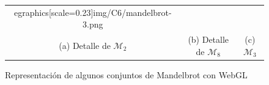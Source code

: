 \begin{figure}[ht]
\begin{tabular}{ccc}
egraphics[scale=0.23]{img/C6/mandelbrot-3.png} \\
    (a) Detalle de $\mathcal{M}_2$ & (b) Detalle de $\mathcal{M}_8$ & (c) $\mathcal{M}_3$ \\[6pt]
    \end{tabular}
    \caption{Representación de algunos conjuntos de Mandelbrot con WebGL}
    \label{fig:mandelbrot-webgl}
\end{figure}

